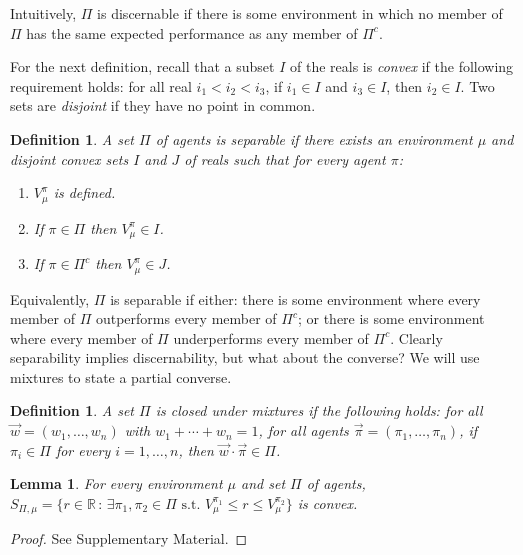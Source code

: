 \documentclass[twoside]{article}
\newtheorem{definition}[theorem]{Definition}
\newtheorem{lemma}[theorem]{Lemma}
\begin{document}
Intuitively, $\Pi$ is discernable if there is some environment in which
no member of $\Pi$ has the same expected performance as any member of $\Pi^c$.

For the next definition, recall that a subset $I$ of the reals
is \emph{convex} if the following requirement holds:
for all real $i_1<i_2<i_3$, if $i_1\in I$ and $i_3\in I$, then $i_2\in I$.
Two sets are \emph{disjoint} if they have no point in common.

\begin{definition}
\label{incentivizabilitydefn}
    A set $\Pi$ of agents is \emph{separable} if there exists
    an environment $\mu$ and disjoint convex sets $I$ and $J$ of
    reals such that for every agent $\pi$:
    \begin{enumerate}
        \item
        $V^\pi_\mu$ is defined.
        \item
        If $\pi\in \Pi$ then $V^\pi_\mu\in I$.
        \item
        If $\pi\in \Pi^c$ then $V^\pi_\mu\in J$.
    \end{enumerate}
\end{definition}

Equivalently, $\Pi$ is separable if either: there is some environment where
every member of $\Pi$ outperforms every member of $\Pi^c$; or there is some
environment where every member of $\Pi$ underperforms every member of $\Pi^c$.
Clearly separability implies discernability, but what about the converse?
We will use mixtures to state a partial converse.

\begin{definition}
\label{mixtureclosuredef}
    A set $\Pi$ is \emph{closed under mixtures} if the following
    holds: for all $\vec w=(w_1,\ldots,w_n)$
    with $w_1+\cdots+w_n=1$,
    for all agents $\vec\pi=(\pi_1,\ldots,\pi_n)$,
    if $\pi_i\in \Pi$ for every $i=1,\ldots,n$, then
    $\vec w\cdot\vec\pi\in\Pi$.
\end{definition}

\begin{lemma}
\label{convexsetlemma}
    For every environment $\mu$ and set $\Pi$ of agents,
    $
        S_{\Pi,\mu}=\{
            r\in\mathbb R
            \,:\,
            \exists \pi_1,\pi_2\in\Pi\mbox{ s.t. }V^{\pi_1}_\mu\leq r\leq V^{\pi_2}_\mu
        \}
    $
    is convex.
\end{lemma}

\begin{proof}
    See Supplementary Material.
\end{proof}
\end{document}
